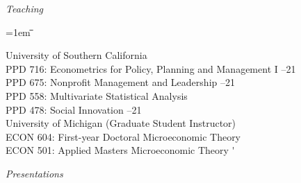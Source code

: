 \documentclass[12pt]{article}
\newcommand{\libertineSB}[1]{\textit{#1}}
\newlength{\midlength}
\newlength{\firstlength}
\newlength{\listindent}
\newlength{\dategap}
\newlength{\wrapgap}
\newcommand{\heading}[1]{
	{\setlength{\parskip}{0.8cm plus6mm minus3mm}
	\parindent=0pt
	\large \libertineSB{{#1}}}
	\vspace{0.1em}
}
\newenvironment{datetabbing}{
	\begin{tabbing}
	\parskip=1em
	\hspace*{\listindent}\=\hspace*{\firstlength}\=\hspace*{\midlength}\= \kill
}{
	\end{tabbing}
}
\begin{document}
\heading{Teaching}

\begin{datetabbing}
\>	University of Southern California													\\[\wrapgap]
\>	\>	PPD 716: Econometrics for Policy, Planning and Management I %
																--21	\'	\\[\wrapgap]
\>	\>	PPD 675: Nonprofit Management and Leadership				--21	\'	\\[\wrapgap]
\>	\>	PPD 558: Multivariate Statistical Analysis						\'	\\[\wrapgap]
\>	\>	PPD 478: Social Innovation %
																--21	\'	\\[\dategap]

\>	University of Michigan (Graduate Student Instructor)								\\
\>	\>	ECON 604: First-year Doctoral Microeconomic Theory				\'	\\[\wrapgap]
\>	\>	ECON 501: Applied Masters Microeconomic Theory					\'	%
\end{datetabbing}



\clearpage
\heading{Presentations}
\end{document}

